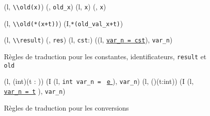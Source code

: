 \begin{figure*}[bt]
  \scriptsize{
    {
      {(l, \mbox{\lstinline'\\old(x)'}) 
        (\emptylist, \mbox{\lstinline'old_x'})}
    }
    {
      {(l, \mbox{\lstinline'x'}) 
        (\emptylist, \mbox{\lstinline'x'})}
    }

    {
      {(l, \mbox{\lstinline'\\old(*(x+t))'}) 
        (I,\mbox{\lstinline'*(old_val_x+t)'})}
    }

    {
      {(l, \mbox{\lstinline'\\result'}) 
        (\emptylist, \mbox{\lstinline'res'})}
    }
    {
      {(l, \mbox{\lstinline'cst'}:) 
        ((l, \underline{\Zinit\mbox{\lstinline'var_n = cst'}}\semicolon),
        \mbox{\lstinline'var_n'})}
    }
  }
  \caption{Règles de traduction pour les constantes, identificateurs,
    \lstinline'result' et \lstinline'old'}
  \label{fig:const-id}
\end{figure*}

\begin{figure*}[bt]
  \scriptsize{
    {
      {
        (l, (int)(t : )) 
        (I \concat (l,
        \mbox{\lstinline'int var_n ='}~
        \underline{\mbox{\lstinline'e'} \Zclear}
        \semicolon
        ), \mbox{\lstinline'var_n'})
      }
    }
    {
      {(l, ()(t:int))  (I \concat (l,
        \underline{\Zinit \mbox{\lstinline'var_n = t'}}
        \semicolon
        ), \mbox{\lstinline'var_n'})}
    }
  }
  \caption{Règles de traduction pour les conversions}
  \label{fig:coerce}
\end{figure*}

